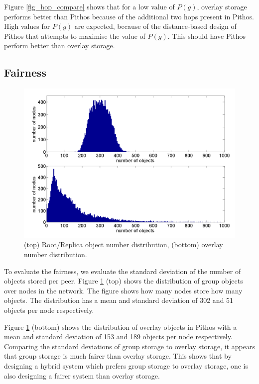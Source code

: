 \documentclass[10pt,a4paper,conference]{IEEEtran}
\begin{document}
Figure \ref{fig_hop_compare} shows that for a low value of $P(g)$, overlay storage performs better than Pithos because of the additional two hops
present in Pithos. High values for $P(g)$ are expected, because of the distance-based design of Pithos that attempts to maximise the value of $P(g)$.
This should have Pithos perform better than overlay storage.

\subsection{Fairness}

\begin{figure}[htbp]
 \centering
 \includegraphics[clip=true, viewport=1cm 0.5cm 28.5cm 20cm, width=\columnwidth]{RootRepOverlayObjects}
 \caption{(top) Root/Replica object number distribution, (bottom) overlay number distribution.}
 \label{fig_group_overlay_objects}
\end{figure}
%
To evaluate the fairness, we evaluate the standard deviation of the number of objects stored per peer. Figure \ref{fig_group_overlay_objects} (top)
shows the distribution of group objects over nodes in the network. The figure shows how many nodes store how many objects. The distribution has a
mean and standard deviation of 302 and 51 objects per node respectively.

Figure \ref{fig_group_overlay_objects} (bottom) shows the distribution of overlay objects in Pithos with a mean and standard deviation of 153 and 189
objects per node respectively. Comparing the standard deviations of group storage to overlay storage, it appears that group storage is much fairer
than overlay storage. This shows that by designing a hybrid system which prefers group storage to overlay storage, one is also designing a fairer
system than overlay storage.
\end{document}

